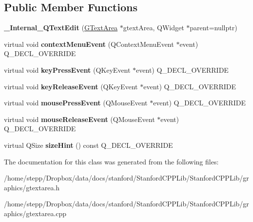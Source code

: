 \subsection*{Public Member Functions}
\begin{DoxyCompactItemize}
\item 
\mbox{\label{class__Internal__QTextEdit_ab753454e77a2d0f8bed67b33a9377f0c}} 
{\bfseries \+\_\+\+Internal\+\_\+\+Q\+Text\+Edit} (\mbox{\hyperlink{classGTextArea}{G\+Text\+Area}} $\ast$gtext\+Area, Q\+Widget $\ast$parent=nullptr)
\item 
\mbox{\label{class__Internal__QTextEdit_a915d2e92abd3ee3085d3f5bd1b1d1cc5}} 
virtual void {\bfseries context\+Menu\+Event} (Q\+Context\+Menu\+Event $\ast$event) Q\+\_\+\+D\+E\+C\+L\+\_\+\+O\+V\+E\+R\+R\+I\+DE
\item 
\mbox{\label{class__Internal__QTextEdit_a173bfc924c19098c914b6c43c51d5796}} 
virtual void {\bfseries key\+Press\+Event} (Q\+Key\+Event $\ast$event) Q\+\_\+\+D\+E\+C\+L\+\_\+\+O\+V\+E\+R\+R\+I\+DE
\item 
\mbox{\label{class__Internal__QTextEdit_a5418bdc7cb0f82ba7062a49f5c273fa9}} 
virtual void {\bfseries key\+Release\+Event} (Q\+Key\+Event $\ast$event) Q\+\_\+\+D\+E\+C\+L\+\_\+\+O\+V\+E\+R\+R\+I\+DE
\item 
\mbox{\label{class__Internal__QTextEdit_a98d3d78dff84b4e652a3f5e43ee13e61}} 
virtual void {\bfseries mouse\+Press\+Event} (Q\+Mouse\+Event $\ast$event) Q\+\_\+\+D\+E\+C\+L\+\_\+\+O\+V\+E\+R\+R\+I\+DE
\item 
\mbox{\label{class__Internal__QTextEdit_a24d961d3ece76ca4a4e40f825075fc77}} 
virtual void {\bfseries mouse\+Release\+Event} (Q\+Mouse\+Event $\ast$event) Q\+\_\+\+D\+E\+C\+L\+\_\+\+O\+V\+E\+R\+R\+I\+DE
\item 
\mbox{\label{class__Internal__QTextEdit_a79423ae8e2fd88bc53f0d4667fc5b8b9}} 
virtual Q\+Size {\bfseries size\+Hint} () const Q\+\_\+\+D\+E\+C\+L\+\_\+\+O\+V\+E\+R\+R\+I\+DE
\end{DoxyCompactItemize}


The documentation for this class was generated from the following files\+:\begin{DoxyCompactItemize}
\item 
/home/stepp/\+Dropbox/data/docs/stanford/\+Stanford\+C\+P\+P\+Lib/\+Stanford\+C\+P\+P\+Lib/graphics/gtextarea.\+h\item 
/home/stepp/\+Dropbox/data/docs/stanford/\+Stanford\+C\+P\+P\+Lib/\+Stanford\+C\+P\+P\+Lib/graphics/gtextarea.\+cpp\end{DoxyCompactItemize}
